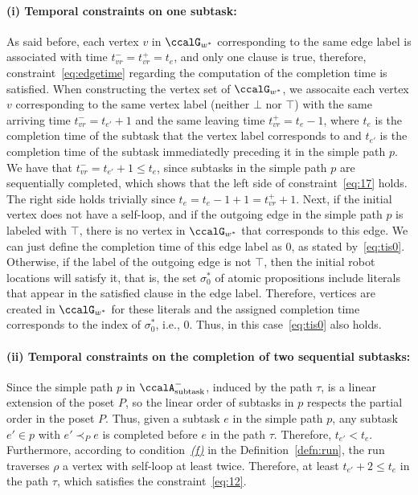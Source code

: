 \documentclass[Afour,sageh,times]{sagej}
\newcommand{\auto}[1]{\ccalA_{\textup{#1}}}
\begin{document}
{{\paragraph{(i) Temporal constraints on one subtask:} As said before, each vertex $v$ in $\ccalG_{w^*}$ corresponding to the same edge label is associated with time $t_{vr}^- = t_{vr}^+ = t_e$, and only one clause is true, therefore, constraint~\eqref{eq:edgetime} regarding the computation of the completion time is satisfied. When constructing the vertex set of $\ccalG_{w^*}$, we assocaite each vertex $v$ corresponding to the same vertex label (neither $\bot$ nor $\top$) with the same arriving time $t_{vr}^- = t_{e'}+1$ and the same leaving time $t_{vr}^+ = t_{e}-1$, where $t_e$ is the completion time of the subtask that the vertex label corresponds to and $t_{e'}$ is the completion time of the subtask immediatedly preceding it in the simple path $p$. We have that $t_{vr}^- = t_{e'}+1\leq t_e$, since subtasks in  the simple path $p$ are sequentially completed, which shows that the left side of constraint~\eqref{eq:17} holds. The right side holds trivially since $t_e = t_e-1+1 = t_{vr}^+ +1$. Next, if the initial vertex does not have a self-loop, and if the outgoing edge in the simple path $p$ is labeled with $\top$, there is no vertex in $\ccalG_{w^*}$ that corresponds to this edge. We can just define the completion time of this edge label as 0, as stated by~\eqref{eq:tis0}. Otherwise, if the label of the outgoing edge is not $\top$, then the initial robot locations will satisfy it, that is, the set $\sigma^*_0$ of atomic propositions include literals that appear in the satisfied clause in the edge label.
Therefore, vertices are created in $\ccalG_{w^*}$ for these literals and the assigned completion time corresponds to the index of $\sigma_0^*$, i.e., 0. Thus, in this case~\eqref{eq:tis0} also holds.

\paragraph{(ii) Temporal constraints on the completion of two sequential subtasks:}
Since the simple path $p$ in $\auto{subtask}^-$, induced by the path $\tau$, is a linear extension of the poset $P$, so the linear order of subtasks in $p$ respects the partial order in the poset $P$. Thus, given a subtask $e$ in the simple path $p$, any subtask $e'\in p$ with $e' \prec_P e$ is completed before $e$ in the path $\tau$. Therefore, $t_{e'} <t_e$. Furthermore, according to condition~\hyperref[cond:f]{\it (f)} in the Definition~\ref{defn:run}, the  run traverses $\rho$ a vertex with self-loop at least twice. Therefore, at least $t_{e'} + 2 \leq t_e$ in the path $\tau$, which satisfies the constraint~\eqref{eq:12}. %
}}
\end{document}
